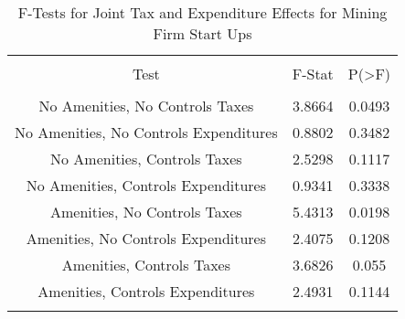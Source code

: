 
\begin{table}[!htbp] \centering 
  \caption{F-Tests for Joint Tax and Expenditure Effects for Mining Firm Start Ups} 
  \label{21Ftests} 
\begin{tabular}{@{\extracolsep{5pt}} ccc} 
\\[-1.8ex]\hline 
\hline \\[-1.8ex] 
Test & F-Stat & P(\textgreater F) \\ 
\hline \\[-1.8ex] 
No Amenities, No Controls Taxes & 3.8664 & 0.0493 \\ 
No Amenities, No Controls Expenditures & 0.8802 & 0.3482 \\ 
No Amenities, Controls Taxes & 2.5298 & 0.1117 \\ 
No Amenities, Controls Expenditures & 0.9341 & 0.3338 \\ 
Amenities, No Controls Taxes & 5.4313 & 0.0198 \\ 
Amenities, No Controls Expenditures & 2.4075 & 0.1208 \\ 
Amenities, Controls Taxes & 3.6826 & 0.055 \\ 
Amenities, Controls Expenditures & 2.4931 & 0.1144 \\ 
\hline \\[-1.8ex] 
\end{tabular} 
\end{table} 
